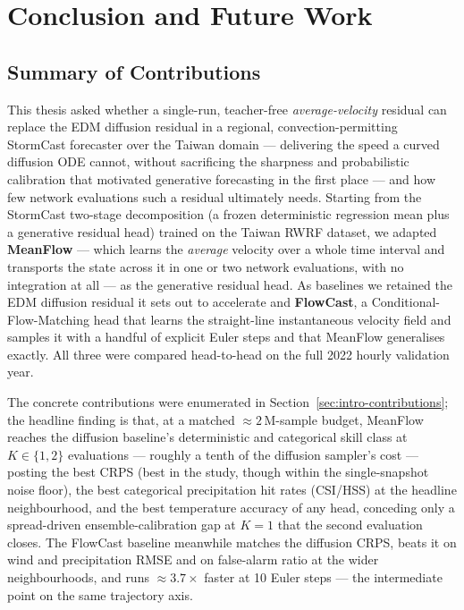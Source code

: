 
\chapter{Conclusion and Future Work}
\label{ch:conclusion}

\section{Summary of Contributions}
\label{sec:concl-summary}

This thesis asked whether a single-run, teacher-free \emph{average-velocity} residual can replace the EDM diffusion residual in a regional, convection-permitting StormCast forecaster over the Taiwan domain --- delivering the speed a curved diffusion ODE cannot, without sacrificing the sharpness and probabilistic calibration that motivated generative forecasting in the first place --- and how few network evaluations such a residual ultimately needs. Starting from the StormCast two-stage decomposition (a frozen deterministic regression mean plus a generative residual head) trained on the Taiwan RWRF dataset, we adapted \textbf{MeanFlow} --- which learns the \emph{average} velocity over a whole time interval and transports the state across it in one or two network evaluations, with no integration at all --- as the generative residual head. As baselines we retained the EDM diffusion residual it sets out to accelerate and \textbf{FlowCast}, a Conditional-Flow-Matching head that learns the straight-line instantaneous velocity field and samples it with a handful of explicit Euler steps and that MeanFlow generalises exactly. All three were compared head-to-head on the full 2022 hourly validation year.

The concrete contributions were enumerated in Section~\ref{sec:intro-contributions}; the headline finding is that, at a matched $\approx 2\,\text{M}$-sample budget, MeanFlow reaches the diffusion baseline's deterministic and categorical skill class at $K \in \{1, 2\}$ evaluations --- roughly a tenth of the diffusion sampler's cost --- posting the best CRPS (best in the study, though within the single-snapshot noise floor), the best categorical precipitation hit rates (CSI/HSS) at the headline neighbourhood, and the best temperature accuracy of any head, conceding only a spread-driven ensemble-calibration gap at $K = 1$ that the second evaluation closes. The FlowCast baseline meanwhile matches the diffusion CRPS, beats it on wind and precipitation RMSE and on false-alarm ratio at the wider neighbourhoods, and runs $\approx 3.7\times$ faster at 10 Euler steps --- the intermediate point on the same trajectory axis.

